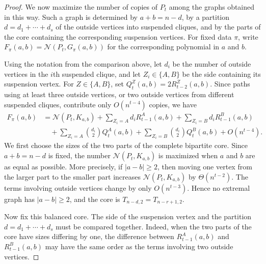 \documentclass[11pt]{article}
\theoremstyle{definition}
\theoremstyle{plain}
\theoremstyle{remark}
\theoremstyle{plain}
\numberwithin{equation}{section}
\newcommand{\N}{\mathcal N}
\begin{document}
\begin{proof}
We now maximize the number of copies of $P_t$ among the graphs obtained in this way. Such a graph is determined by $a+b=n-d$, by a partition $d=d_1+\cdots+d_s$ of the outside vertices into suspended cliques, and by the parts of the core containing the corresponding suspension vertices. For fixed data $\pi$, write $F_\pi(a,b)=\N(P_t,G_\pi(a,b))$ for the corresponding polynomial in $a$ and $b$.

Using the notation from the comparison above, let $d_i$ be the number of outside vertices in the $i$th suspended clique, and let $Z_i\in\{A,B\}$ be the side containing its suspension vertex. For $Z\in\{A,B\}$, set $Q_t^Z(a,b)=2R_{t-2}^Z(a,b)$. Since paths using at least three outside vertices, or two outside vertices from different suspended cliques, contribute only $O(n^{t-4})$ copies, we have
\[
\begin{aligned}
        F_\pi(a,b)
        &=\N(P_t,K_{a,b})
        +\sum_{Z_i=A} d_i R_{t-1}^A(a,b)
        +\sum_{Z_i=B} d_i R_{t-1}^B(a,b)\\
        &\quad
        +\sum_{Z_i=A}\binom{d_i}{2}Q_t^A(a,b)
        +\sum_{Z_i=B}\binom{d_i}{2}Q_t^B(a,b)
        +O(n^{t-4}).
\end{aligned}
\]
We first choose the sizes of the two parts of the complete bipartite core. Since $a+b=n-d$ is fixed, the number $\N(P_t,K_{a,b})$ is maximized when $a$ and $b$ are as equal as possible. More precisely, if $|a-b|\ge2$, then moving one vertex from the larger part to the smaller part increases $\N(P_t,K_{a,b})$ by $\Theta(n^{t-2})$. The terms involving outside vertices change by only $O(n^{t-3})$. Hence no extremal graph has $|a-b|\ge2$, and the core is $T_{n-d,2}=T_{n-r+1,2}$.

Now fix this balanced core. The side of the suspension vertex and the partition $d=d_1+\cdots+d_s$ must be compared together. Indeed, when the two parts of the core have sizes differing by one, the difference between $R_{t-1}^A(a,b)$ and $R_{t-1}^B(a,b)$ may have the same order as the terms involving two outside vertices.


\end{proof}
\end{document}
